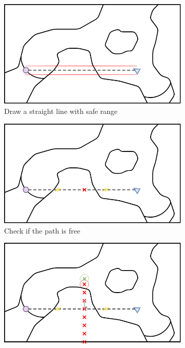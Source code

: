 \documentclass[../main.tex]{subfiles}
\begin{document}
\begin{figure}[H]
	\centering
	\begin{subfigure}[b]{0.45\textwidth}
		\centering
		\includegraphics[width=\textwidth]{IMAGES/part3/methode1.png}
		\caption{Draw a straight line with safe range}
		\label{fig:draw_line}
	\end{subfigure}
	\hfill
	\begin{subfigure}[b]{0.45\textwidth}
		\centering
		\includegraphics[width=\textwidth]{IMAGES/part3/methode2.png}
		\caption{Check if the path is free}
		\label{fig:check_line}
	\end{subfigure}
	\vfill
	\begin{subfigure}[b]{0.45\textwidth}
		\centering
		\includegraphics[width=\textwidth]{IMAGES/part3/methode3.png}

\end{subfigure}
\end{figure}
\end{document}
